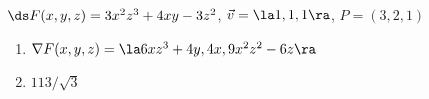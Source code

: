 {$\ds F(x,y,z) = 3x^2z^3+4xy-3z^2$, $\vec v = \la 1,1,1\ra$, $P = (3,2,1)$
}
{
\begin{enumerate}
	\item $\nabla F(x,y,z) = \la 6xz^3+4y, 4x, 9x^2z^2-6z\ra$
	\item	$113/\sqrt{3}$
\end{enumerate}
}